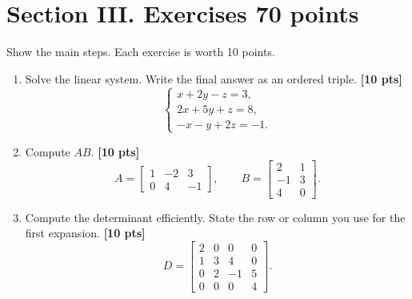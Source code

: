 \documentclass[11pt]{article}
\newif\ifshowsolutions
\newcommand{\pts}[1]{\hfill\textbf{[#1 pts]}}
\newcommand{\workarea}[1]{\ifshowsolutions\else\vspace{#1}\fi}
\newcommand{\solution}[1]{%
  \ifshowsolutions
    \par\medskip
    {\color{solutionblue}\textbf{Solution.} #1}
    \par\medskip
  \fi}
\begin{document}
\newpage
\section*{Section III. Exercises \hfill 70 points}

Show the main steps. Each exercise is worth 10 points.

\begin{enumerate}
\item Solve the linear system. Write the final answer as an ordered triple. \pts{10}
\[
\begin{cases}
x+2y-z=3,\\
2x+5y+z=8,\\
-x-y+2z=-1.
\end{cases}
\]
\workarea{2.3in}
\solution{Row reduction, or substitution, gives $y+3z=2$ and $y+z=2$. Hence $z=0$, $y=2$, and $x=-1$. Thus $\boxed{(x,y,z)=(-1,2,0)}$.}

\item Compute $AB$. \pts{10}
\[
A=\begin{bmatrix}1&-2&3\\0&4&-1\end{bmatrix},
\qquad
B=\begin{bmatrix}2&1\\-1&3\\4&0\end{bmatrix}.
\]
\workarea{2.2in}
\solution{
\[
AB=
\begin{bmatrix}
1(2)+(-2)(-1)+3(4) & 1(1)+(-2)(3)+3(0)\\
0(2)+4(-1)+(-1)(4) & 0(1)+4(3)+(-1)(0)
\end{bmatrix}
=\boxed{\begin{bmatrix}16&-5\\-8&12\end{bmatrix}}.
\]}

\newpage
\item Compute the determinant efficiently. State the row or column you use for the first expansion. \pts{10}
\[
D=\begin{bmatrix}
2&0&0&0\\
1&3&4&0\\
0&2&-1&5\\
0&0&0&4
\end{bmatrix}.
\]
\workarea{2.2in}
\solution{Expand first along row 1, then along the last column of the remaining matrix:
\[
\det D=2\cdot4\det\begin{bmatrix}3&4\\2&-1\end{bmatrix}
=8(-3-8)=\boxed{-88}.
\]}


\end{enumerate}
\end{document}
